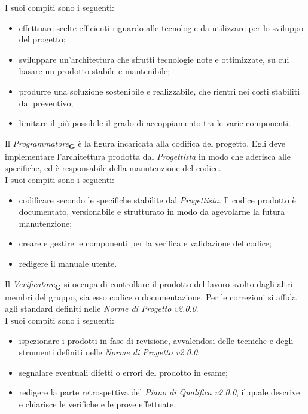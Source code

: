 I suoi compiti sono i seguenti:
\begin {itemize}
\item effettuare scelte efficienti riguardo alle tecnologie da utilizzare per lo sviluppo del progetto;
\item sviluppare un'architettura che sfrutti tecnologie note e ottimizzate, su cui basare un prodotto stabile e mantenibile;
\item produrre una soluzione sostenibile e realizzabile, che rientri nei costi stabiliti dal preventivo;
\item limitare il più possibile il grado di accoppiamento tra le varie componenti.
\end {itemize}
Il \textit{Programmatore}\textsubscript{\textbf{G}} è la figura incaricata alla codifica del progetto. Egli deve implementare l’architettura prodotta dal \textit{Progettista} in modo che aderisca alle specifiche, ed è responsabile della manutenzione del codice.\\
I suoi compiti sono i seguenti:
\begin {itemize}
\item codificare secondo le specifiche stabilite dal \textit{Progettista}. Il codice prodotto è documentato, versionabile e strutturato in modo da agevolarne la futura manutenzione;
\item creare e gestire le componenti per la verifica e validazione del codice;
\item redigere il manuale utente.
\end {itemize}
Il \textit{Verificatore}\textsubscript{\textbf{G}} si occupa di controllare il prodotto del lavoro svolto dagli altri membri del gruppo, sia esso codice o documentazione. Per le correzioni si affida agli standard definiti nelle \textit{Norme di Progetto v2.0.0}.\\
I suoi compiti sono i seguenti:
\begin {itemize}
\item ispezionare i prodotti in fase di revisione, avvalendosi delle tecniche e degli strumenti definiti nelle \textit{Norme di Progetto v2.0.0};
\item segnalare eventuali difetti o errori del prodotto in esame;
\item redigere la parte retrospettiva del \textit{Piano di Qualifica v2.0.0}, il quale descrive e chiarisce le verifiche e le prove effettuate.
\end {itemize}
